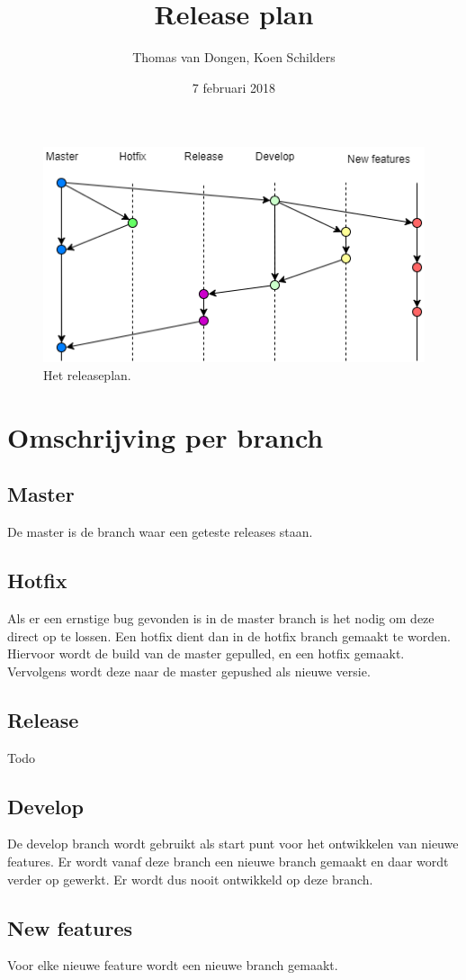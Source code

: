 \documentclass[12pt]{article}
\title{Release plan}
\author{Thomas van Dongen, Koen Schilders}
\date{7 februari 2018}
\begin{document}
\begin{titlepage}
\maketitle
\end{titlepage}

\begin{figure}
	\includegraphics[width=\textwidth]{images/SOP6_Release.png}
	\caption{Het releaseplan.}
\end{figure}

\section{Omschrijving per branch}
\subsection{Master}
De master is de branch waar een geteste releases staan.
\subsection{Hotfix}
Als er een ernstige bug gevonden is in de master branch is het nodig om deze direct op te lossen. Een hotfix dient dan in de hotfix branch gemaakt te worden. Hiervoor wordt de build van de master gepulled, en een hotfix gemaakt. Vervolgens wordt deze naar de master gepushed als nieuwe versie.
\subsection{Release}
Todo
\subsection{Develop}
De develop branch wordt gebruikt als start punt voor het ontwikkelen van nieuwe features. Er wordt vanaf deze branch een nieuwe branch gemaakt en daar wordt verder op gewerkt. Er wordt dus nooit ontwikkeld op deze branch.
\subsection{New features}
Voor elke nieuwe feature wordt een nieuwe branch gemaakt.
\end{document}
